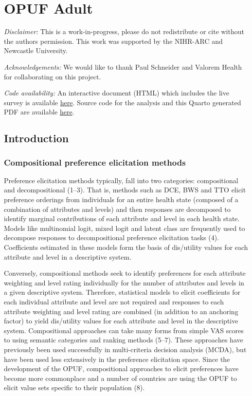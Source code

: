 \documentclass[
  letterpaper,
  DIV=11,
  numbers=noendperiod]{scrartcl}
\subtitle{Development of a value-based scoring system for the WAItE
using the OPUF in a sample of adults}
\author{William King* \and Tomos Robinson \and Angela Bate \and Laura
Ternent}
\date{2025-01-14}
\begin{document}
\section{OPUF Adult}\label{sec-opufadult}

\emph{Disclaimer:} This is a work-in-progress, please do not
redistribute or cite without the authors permission. This work was
supported by the NIHR-ARC and Newcastle University.

\emph{Acknowledgements:} We would like to thank Paul Schneider and
Valorem Health for collaborating on this project.

\emph{Code availability:} An interactive document (HTML) which includes
the live survey is available
\href{https://willking98.github.io/opuf-adult/}{here}. Source code for
the analysis and this Quarto generated PDF are available
\href{https://github.com/willking98/opuf-adult}{here}.

\subsection{Introduction}\label{sec-introduction}

\subsubsection{Compositional preference elicitation
methods}\label{compositional-preference-elicitation-methods}

Preference elicitation methods typically, fall into two categories:
compositional and decompositional (1--3). That is, methods such as DCE,
BWS and TTO elicit preference orderings from individuals for an entire
health state (composed of a combination of attributes and levels) and
then responses are decomposed to identify marginal contributions of each
attribute and level in each health state. Models like multinomial logit,
mixed logit and latent class are frequently used to decompose responses
to decompositional preference elicitation tasks (4). Coefficients
estimated in these models form the basis of dis/utility values for each
attribute and level in a descriptive system.

Conversely, compositional methods seek to identify preferences for each
attribute weighting and level rating individually for the number of
attributes and levels in a given descriptive system. Therefore,
statistical models to elicit coefficients for each individual attribute
and level are not required and responses to each attribute weighting and
level rating are combined (in addition to an anchoring factor) to yield
dis/utility values for each attribute and level in the descriptive
system. Compositional approaches can take many forms from simple VAS
scores to using semantic categories and ranking methods (5--7). These
approaches have previously been used successfully in multi-criteria
decision analysis (MCDA), but have been used less extensively in the
preference elicitation space. Since the development of the OPUF,
compositional approaches to elicit preferences have become more
commonplace and a number of countries are using the OPUF to elicit value
sets specific to their population (8).
\end{document}
